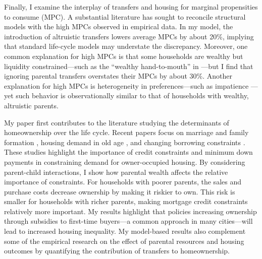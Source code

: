 \documentclass[12pt]{article}
\begin{document}
Finally, I examine the interplay  of transfers and housing for marginal propensities to consume (MPC). A substantial literature has sought to reconcile structural models with the high MPCs observed in empirical data.  In my model, the introduction of altruistic transfers lowers average MPCs by about 20\%, implying that standard life-cycle models may understate the discrepancy.  Moreover, one common explanation for high MPCs is that some households are wealthy but liquidity constrained---such as the ``wealthy hand-to-mouth'' in \cite{kaplan2022marginal}---but I find that ignoring parental transfers overstates their MPCs by about 30\%. Another explanation for high MPCs is heterogeneity in preferences---such as impatience \citep[e.g.,][]{aguiar2024hand}---yet such behavior is observationally similar to that of households with wealthy, altruistic parents.



My paper first contributes to the literature studying the determinants of homeownership over the life cycle. Recent papers focus on marriage and family formation \citep{Fisher2011,Chang2024,Khorunzhina2019}, housing demand in old age \citep{McGee2019,Barczyk2020a}, and changing borrowing constraints \citep{Paz-Pardo2019,Mabille2020}. These studies highlight the importance of credit constraints and minimum down payments in constraining demand for owner-occupied housing. By considering parent-child interactions, I show how parental wealth affects the relative importance of constraints. For households with poorer parents, the sales and purchase costs decrease ownership by making it riskier to own. This risk is smaller for households with richer parents, making mortgage credit constraints relatively more important. My results highlight that policies increasing ownership through subsidies to first-time buyers---a common approach in many cities---will lead to increased housing inequality. My model-based results also complement some of the empirical research on the effect of parental resources and housing outcomes \citep[see e.g.,][for recent work]{wold2024housing,daysal2023intergenerational,benetton2022dynastic,boileau2023drives} by quantifying the contribution of transfers to homeownership.
\end{document}
